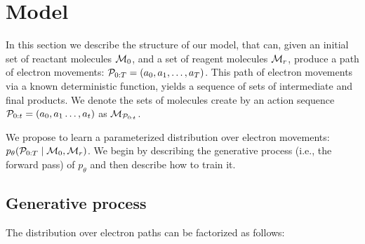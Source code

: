 
\section{Model}
In this section we describe the structure of our model, that can, given an initial set of reactant molecules ${\mathcal{M}}_0$, and a set of reagent molecules ${\mathcal{M}}_r$, produce a path of electron movements: ${\mathcal{P}}_{0:T} = (a_0, a_1, \ldots, a_{T})$. This path of electron movements via a known deterministic function, yields a sequence of sets of intermediate and final products. We denote the sets of molecules create by an action sequence ${\mathcal{P}}_{0:t} = (a_0, a_1 \ldots, a_{t})$ as ${\mathcal{M}}_{{\mathcal{P}}_{0:t}}$. 

We propose to learn a parameterized distribution over electron movements: $p_\theta( {\mathcal{P}}_{0:T} \mid {\mathcal{M}}_0, {\mathcal{M}}_r)$. We begin by describing the generative process (i.e., the forward pass) of $p_\theta$ and then describe how to train it.







\subsection{Generative process}
The distribution over electron paths can be factorized as follows:

